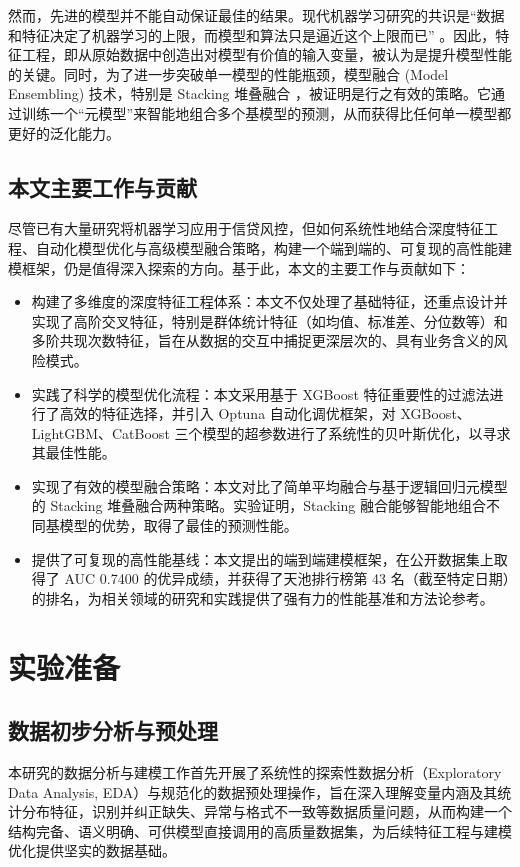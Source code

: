 \documentclass{thuemp}
\begin{document}
然而，先进的模型并不能自动保证最佳的结果。现代机器学习研究的共识是“数据和特征决定了机器学习的上限，而模型和算法只是逼近这个上限而已” \citep{ng2016nutshell}。因此，特征工程，即从原始数据中创造出对模型有价值的输入变量，被认为是提升模型性能的关键。同时，为了进一步突破单一模型的性能瓶颈，模型融合 (Model Ensembling) 技术，特别是 Stacking 堆叠融合 \citep{wolpert1992stacked}，被证明是行之有效的策略。它通过训练一个“元模型”来智能地组合多个基模型的预测，从而获得比任何单一模型都更好的泛化能力。

\subsection{本文主要工作与贡献}
尽管已有大量研究将机器学习应用于信贷风控，但如何系统性地结合深度特征工程、自动化模型优化与高级模型融合策略，构建一个端到端的、可复现的高性能建模框架，仍是值得深入探索的方向。基于此，本文的主要工作与贡献如下：

\begin{itemize}
    \item 构建了多维度的深度特征工程体系：本文不仅处理了基础特征，还重点设计并实现了高阶交叉特征，特别是群体统计特征（如均值、标准差、分位数等）和多阶共现次数特征，旨在从数据的交互中捕捉更深层次的、具有业务含义的风险模式。
    \item 实践了科学的模型优化流程：本文采用基于 XGBoost 特征重要性的过滤法进行了高效的特征选择，并引入 Optuna 自动化调优框架，对 XGBoost、LightGBM、CatBoost 三个模型的超参数进行了系统性的贝叶斯优化，以寻求其最佳性能。
    \item 实现了有效的模型融合策略：本文对比了简单平均融合与基于逻辑回归元模型的 Stacking 堆叠融合两种策略。实验证明，Stacking 融合能够智能地组合不同基模型的优势，取得了最佳的预测性能。
    \item 提供了可复现的高性能基线：本文提出的端到端建模框架，在公开数据集上取得了 AUC 0.7400 的优异成绩，并获得了天池排行榜第 43 名（截至特定日期）的排名，为相关领域的研究和实践提供了强有力的性能基准和方法论参考。
\end{itemize}

\section{实验准备}
\subsection{数据初步分析与预处理}
\label{subsec:data_analysis_preprocessing}

本研究的数据分析与建模工作首先开展了系统性的探索性数据分析（Exploratory Data Analysis, EDA）与规范化的数据预处理操作，旨在深入理解变量内涵及其统计分布特征，识别并纠正缺失、异常与格式不一致等数据质量问题，从而构建一个结构完备、语义明确、可供模型直接调用的高质量数据集，为后续特征工程与建模优化提供坚实的数据基础。
\end{document}
